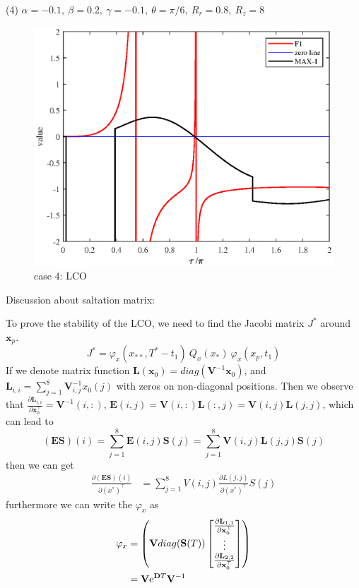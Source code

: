 \documentclass[a4paper,10pt]{article}
\begin{document}
(4) $\alpha = -0.1,~\beta =0.2,~ \gamma = -0.1,~\theta = \pi/6,~R_r=0.8,~R_z=8$

\begin{figure}[h!]
	\centering
	\includegraphics[width=0.5 \linewidth]{BEB_Explanation/figures/class_case4.eps}
	\caption{case 4: LCO}
	\label{fig: class case4}
\end{figure}
\clearpage
Discussion about saltation matrix:
 
To prove the stability of the LCO, we need to find the Jacobi matrix $J^*$ around $\mathbf{x}_p$.
\[ %
J^* = \varphi_x(x_{**},T^*-t_1)~Q_x(x_*)~\varphi_x(x_p,t_1)\]
If we denote matrix function $\mathbf{L}(\mathbf{x}_0)=diag(\mathbf{V}^{-1} \mathbf{x}_0)$, and $\mathbf{L}_{i,i} = \sum_{j=1}^{8}\mathbf{V}_{i,j}^{-1} x_0(j)$ with zeros on non-diagonal positions. Then we observe that  $\frac{\partial \mathbf{L}_{i,i} }{\partial \mathbf{x}_0^{\top}}= \mathbf{V}^{-1}(i,:)$, $\mathbf{E}(i,j) = \mathbf{V}(i,:)\mathbf{L}(:,j)=\mathbf{V}(i,j) \mathbf{L}(j,j)$, which can lead to $$(\mathbf{ES})(i)=\sum_{j=1}^{8} \mathbf{E}(i,j) \mathbf{S}(j)=\sum_{j=1}^{8} \mathbf{V}(i,j) \mathbf{L}(j,j) \mathbf{S}(j)$$ then we can get
\begin{align}
	\frac{\partial (\mathbf{ES})(i)}{\partial (x^*)^{\top}} & = \sum_{j=1}^{8} V(i,j) \frac{\partial L(j,j)}{\partial (x^*)^{\top}}S(j) %
\end{align}
%
furthermore we can write the $\varphi_x$ as
\begin{align}
	\nonumber
	\varphi_x & =  \left( \mathbf{V} diag(\mathbf{S}(T)) 
	\begin{bmatrix}
		\frac{\partial \mathbf{L}_{1,1}}{\partial \mathbf{x}_0^{\top}}\\
		\vdots \\
		\frac{\partial \mathbf{L}_{2,2}}{\partial \mathbf{x}_0^{\top}}
	\end{bmatrix}
	\right)
	\\
	& =  \mathbf{V} {\rm e}^{\mathbf{D} T} 
	\mathbf{V}^{-1}
\end{align}
\end{document}
